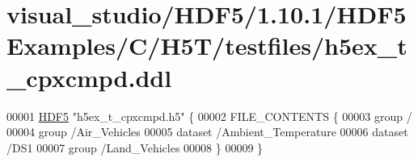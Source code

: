\hypertarget{visual__studio_2_h_d_f5_21_810_81_2_h_d_f5_examples_2_c_2_h5_t_2testfiles_2h5ex__t__cpxcmpd_8ddl_source}{}\section{visual\+\_\+studio/\+H\+D\+F5/1.10.1/\+H\+D\+F5\+Examples/\+C/\+H5\+T/testfiles/h5ex\+\_\+t\+\_\+cpxcmpd.ddl}
\label{visual__studio_2_h_d_f5_21_810_81_2_h_d_f5_examples_2_c_2_h5_t_2testfiles_2h5ex__t__cpxcmpd_8ddl_source}

\begin{DoxyCode}
00001 \hyperlink{namespace_h_d_f5}{HDF5} \textcolor{stringliteral}{"h5ex\_t\_cpxcmpd.h5"} \{
00002 FILE\_CONTENTS \{
00003  group      /
00004  group      /Air\_Vehicles
00005  dataset    /Ambient\_Temperature
00006  dataset    /DS1
00007  group      /Land\_Vehicles
00008  \}
00009 \}
\end{DoxyCode}
